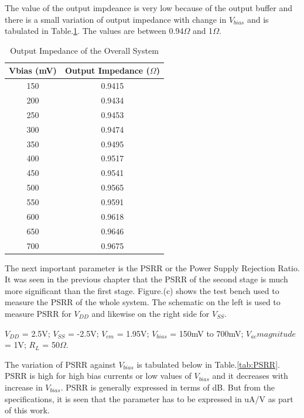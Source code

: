 The value of the output impdeance is very low because of the output buffer and there is a small variation of output impedance with change in $V_{bias}$ and is tabulated in Table.\ref{tab:ZOUT}. The values are between 0.94$\Omega$ and 1$\Omega$.
\begin{table} [H]
\centering
\begin{tabular}{@{}cc@{}}
\toprule
Vbias (mV)			& Output Impedance ($\Omega$)	\\ \midrule
150					& 0.9415 \\
200					& 0.9434 \\
250					& 0.9453 \\
300					& 0.9474 \\
350					& 0.9495 \\
400					& 0.9517 \\
450					& 0.9541 \\
500					& 0.9565 \\
550					& 0.9591 \\
600					& 0.9618 \\
650					& 0.9646 \\
700 				& 0.9675 \\
\bottomrule
\end{tabular}
\caption{Output Impedance of the Overall System}
\label{tab:ZOUT}
\end{table}

The next important parameter is the PSRR or the Power Supply Rejection Ratio. It was seen in the previous chapter that the PSRR of the second stage is much more significant than the first stage. Figure.(c) shows the test bench used to measure the PSRR of the whole system. The schematic on the left is used to measure PSRR for $V_{DD}$ and likewise on the right side for $V_{SS}$.

$V_{DD}$ = 2.5V; $V_{SS}$ = -2.5V; $V_{cm}$ = 1.95V; $V_{bias}$ = 150mV to 700mV;  $V_{ac} magnitude$ = 1V; $R_{L}$ = 50$\Omega$.

The variation of PSRR against $V_{bias}$ is tabulated below in Table.\ref{tab:PSRR}. PSRR is high for high bias currents or low values of $V_{bias}$ and it decreases with increase in $V_{bias}$. PSRR is generally expressed in terms of dB. But from the specifications, it is seen that the parameter has to be expressed in uA/V as part of this work.

